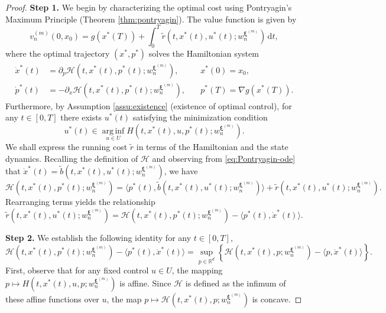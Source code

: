 \documentclass[10pt,a4paper]{amsart}
\newcommand{\R}{\mathbb{R}}
\newcommand{\dd}{\mathrm{d}}
\begin{document}
\begin{proof}
{\bf Step 1.} We begin by characterizing the optimal cost using Pontryagin's Maximum Principle (Theorem \ref{thm:pontryagin}). The value function is given by 
\begin{equation} \label{eq:optimal-cost}
    v_n^{(m)}(0,x_0) = g(x^*(T)) + \int_0^T \tilde{r}(t,x^*(t), u^*(t);w_n^{\bm{\xi}^{(m)}})\,\dd t, 
\end{equation}
where the optimal trajectory $(x^*, p^*)$ solves the Hamiltonian system 
\begin{equation} \label{eq:Pontryagin-ode}
\begin{aligned}
    \dot{x}^*(t) &= \partial_p \mathcal{H}(t,x^*(t), p^*(t); w_n^{\bm{\xi}^{(m)}}), \quad &x^*(0) = x_0, \\
    \dot{p}^*(t) &= -\partial_x \mathcal{H}(t, x^*(t), p^*(t); w_n^{\bm{\xi}^{(m)}}), \quad &p^*(T) = \nabla g(x^*(T)). 
\end{aligned}
\end{equation}
Furthermore, by Assumption \ref{assu:existence} (existence of optimal control), for any $t\in [0,T]$ there exists $u^*(t)$ satisfying the minimization condition 
\begin{equation*}
    u^*(t) \in \operatorname*{arg\,inf}_{u\in U} H(t,x^*(t), u, p^*(t); w_n^{\bm{\xi}^{(m)}}).
\end{equation*}
We shall express the running cost $\tilde{r}$ in terms of the Hamiltonian and the state dynamics. 
Recalling the definition of $\mathcal{H}$ and observing from \eqref{eq:Pontryagin-ode} that $\dot{x}^*(t) = \tilde{b}(t,x^*(t), u^*(t); w_n^{\bm{\xi}^{(m)}})$, we have 
\begin{equation*}
    \mathcal{H}(t,x^*(t), p^*(t); w_n^{\bm{\xi}^{(m)}}) = \langle p^*(t), \tilde{b}(t,x^*(t), u^*(t); w_n^{\bm{\xi}^{(m)}})\rangle + \tilde{r}(t,x^*(t), u^*(t); w_n^{\bm{\xi}^{(m)}}). 
\end{equation*}
Rearranging terms yields the relationship 
\begin{equation} \label{eq:r-tilde-by-hamiltonian}
    \tilde{r}(t,x^*(t), u^*(t); w_n^{\bm{\xi}^{(m)}}) = \mathcal{H}(t,x^*(t), p^*(t); w_n^{\bm{\xi}^{(m)}}) - \langle p^*(t), \dot{x}^*(t) \rangle. 
\end{equation}

{\bf Step 2.} We establish the following identity for any $t\in [0,T]$, 
\begin{equation} \label{eq:equivalence-1}
    \mathcal{H}(t,x^*(t), p^*(t); w_n^{\bm{\xi}^{(m)}}) - \langle p^*(t), \dot{x}^*(t) \rangle = \sup_{p\in \R^d}\left\{ \mathcal{H}(t,x^*(t), p; w_n^{\bm{\xi}^{(m)}}) - \langle p, \dot{x}^*(t) \rangle \right\}.
\end{equation}
First, observe that for any fixed control $u\in U$, the mapping $p\mapsto H(t,x^*(t),u, p;w_n^{\bm{\xi}^{(m)}})$ is affine. Since $\mathcal{H}$ is defined as the infimum of these affine functions over $u$, the map $p\mapsto \mathcal{H}(t,x^*(t),p;w_n^{\bm{\xi}^{(m)}})$ is concave. 


\end{proof}
\end{document}
